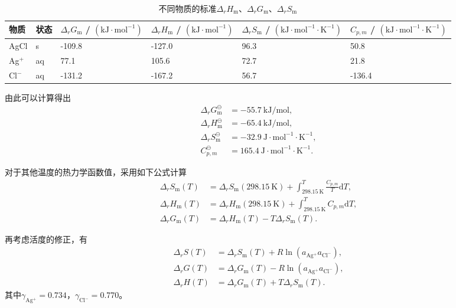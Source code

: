 \documentclass[12pt]{ctexart}
\numberwithin{equation}{section}
\begin{document}
\begin{table}[!h]
\begin{center}
\caption{不同物质的标准$\Delta_r H_\text{m}$、$\Delta_r G_\text{m}$、$\Delta_r S_\text{m}$}
\begin{tabular}{ p{1cm}<{\centering} p{1cm}<{\centering} p{3cm}<{\centering} p{3cm}<{\centering} p{3.5cm}<{\centering} p{3.5cm}<{\centering} }
    \hline
    物质 & 状态 & $\Delta_r G_\text{m}$ / $\mathrm{(kJ\cdot mol^{-1})}$ & $\Delta_r H_\text{m}$ / $\mathrm{(kJ\cdot mol^{-1})}$ & $\Delta_r S_\text{m}$ / $\mathrm{(kJ\cdot mol^{-1}\cdot K^{-1})}$ & $C_{p, m}$ / $\mathrm{(kJ\cdot mol^{-1}\cdot K^{-1})}$ \\
    \hline
    AgCl   & s  & -109.8 & -127.0 & 96.3 &   50.8 \\
    Ag$^+$ & aq &   77.1 &  105.6 & 72.7 &   21.8 \\
    Cl$^-$ & aq & -131.2 & -167.2 & 56.7 & -136.4 \\
    \hline
\end{tabular}
\end{center}
\end{table}

由此可以计算得出
\begin{align}
    \Delta_r G_\text{m}^\ominus &= -55.7~\mathrm{kJ/mol},
    \tag{I.18} \\
    \Delta_r H_\text{m}^\ominus &= -65.4~\mathrm{kJ/mol},
    \tag{I.19} \\
    \Delta_r S_\text{m}^\ominus &= -32.9
    ~\mathrm{J\cdot mol^{-1}\cdot K^{-1}}, \tag{I.20} \\
    C_{p, m}^\ominus &= 165.4
    ~\mathrm{J \cdot mol^{-1} \cdot K^{-1}}. \tag{I.21}
\end{align}

对于其他温度的热力学函数值，采用如下公式计算
\begin{align}
    \Delta_r S_\text{m}(T) &= \Delta_r S_\text{m}(298.15
    ~\mathrm{K}) + \int_{298.15~\mathrm{K}}^{T}
    \frac{C_{p, m}}{T}\mathrm{d}T, \tag{I.22} \\
    \Delta_r H_\text{m}(T) &= \Delta_r H_\text{m}(298.15
    ~\mathrm{K}) + \int_{298.15~\mathrm{K}}^{T}C_{p, m}
    \mathrm{d}T, \tag{I.23} \\
    \Delta_r G_\text{m}(T) &= \Delta_r H_\text{m}(T)
    - T\Delta_r S_\text{m}(T). \tag{I.24}
\end{align}

再考虑活度的修正，有
\begin{align}
    \Delta_r S(T) &= \Delta_r S_\text{m}(T)
    + R\ln(a_{\mathrm{Ag^+}}a_{\mathrm{Cl^-}}), \tag{I.25} \\
    \Delta_r G(T) &= \Delta_r G_\text{m}(T)
    - R\ln(a_{\mathrm{Ag^+}}a_{\mathrm{Cl^-}}), \tag{I.26} \\
    \Delta_r H(T) &= \Delta_r G_\text{m}(T)
    + T \Delta_r S_\text{m}(T). \tag{I.27}
\end{align}
其中$\gamma_{\mathrm{Ag^+}} = 0.734$，$\gamma_{\mathrm{Cl^-}} = 0.770$。
\end{document}

